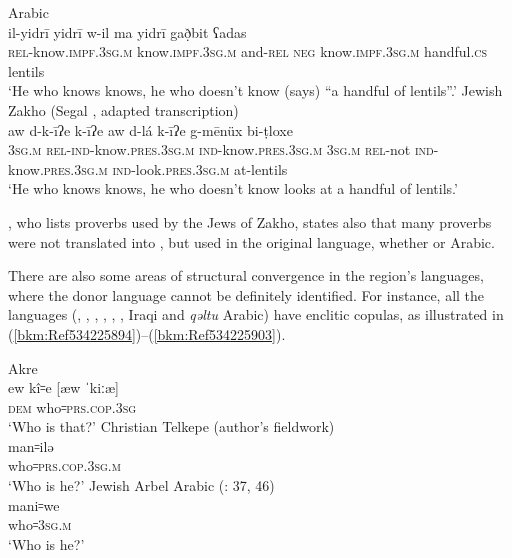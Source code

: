 \documentclass[output=paper]{langsci/langscibook}
\begin{document}
\ea\label{bkm:Ref534225045} Arabic \citep[235]{Chyet1995} \\
\gll il-yidrī   yidrī     w-il ma yidrī     gað̣bit ʕadas\\
    \textsc{rel}\textup{{}-know.}\textsc{impf.3sg.m} \textup{know.}\textsc{impf.3sg.m} \textup{and-}\textsc{rel} \textsc{neg} \textup{know.}\textsc{impf.3sg.m} handful\textsc{.cs} lentils\\
\glt ‘He who knows knows, he who doesn’t know (says) “a handful of lentils”.’
\ex\label{bkm:Ref534225057}Jewish Zakho  (Segal \citeyear[262]{Segal1955}, adapted transcription)\\
\gll aw d-k-īʔe   k-īʔe     aw d-lá k-īʔe   g-mēnüx bi-ṭloxe\\
    \textsc{3sg.m} \textsc{rel}\textup{{}-}\textsc{ind-}\textup{know}\textsc{.pres.3sg.m} \textsc{ind}\textup{{}-know.}\textsc{pres.3sg.m} \textsc{3sg.m} \textsc{rel}\textup{{}-not} \textsc{ind}\textup{{}-know.}\textsc{pres.3sg.m} \textsc{ind-}\textup{look.}\textsc{pres}.\textsc{3sg.m} \textup{at-lentils}\\
\glt ‘He who knows knows, he who doesn’t know looks at a handful of lentils.’\z

\citet{Sabar1978}, who lists proverbs used by the {Jews} of Zakho, states also that many proverbs were not translated into , but used in the original language, whether  or Arabic.

There are also some areas of structural {convergence} in the region’s languages, where the donor language cannot be definitely identified. For instance, all the languages (, , , , , , Iraqi  and \textit{qəltu} Arabic) have enclitic copulas, as illustrated in (\ref{bkm:Ref534225894})–(\ref{bkm:Ref534225903}).

\ea\label{bkm:Ref534225894}Akre  \citep[175]{MacKenzie1961}\\
\gll ew kî꞊e \textup{[æw ˈkiːæ]}\\
     \textsc{dem} who꞊\textsc{prs.cop.3sg}\\
\glt ‘Who is that?’ 
\ex Christian Telkepe  (author’s fieldwork)\\
\gll man꞊ilə\\
     who꞊\textsc{prs.cop.3sg.m}\\
\glt ‘Who is he?’
\ex\label{bkm:Ref534225903}Jewish Arbel Arabic (\citealt{Jastrow1990book}: 37, 46) \\
\gll mani꞊we\\
     who꞊\textsc{3sg.m}\\
\glt ‘Who is he?’\z
\end{document}
